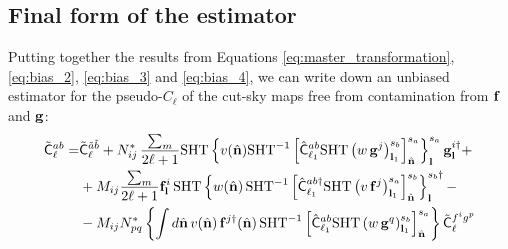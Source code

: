 \documentclass[a4paper,10pt]{article}
\newcommand{\nv}{\hat{\bf n}}
\begin{document}
  \subsection{Final form of the estimator}
    Putting together the results from Equations \ref{eq:master_transformation}, \ref{eq:bias_2}, \ref{eq:bias_3} and \ref{eq:bias_4}, we can write down an unbiased estimator for the pseudo-$C_\ell$ of the cut-sky maps free from contamination from ${\bf f}$ and ${\bf g}$:
    \begin{align}\nonumber
      \tilde{\sf C}^{ab}_\ell=&\tilde{\sf C}^{\tilde{a}\tilde{b}}_\ell+N^*_{ij}\,\frac{\sum_m}{2\ell+1}{\rm SHT}\left\{v(\nv){\rm SHT}^{-1}\left[\hat{\sf C}^{ab}_{\ell_1}{\rm SHT}\left(w\,{\bf g}^j\right)^{s_b}_{{\bf l}_1}\right]^{s_a}_{\nv}\right\}^{s_a}_{\bf l}{\bf g}^{i\dag}_{\bf l}+\\\nonumber
      &+M_{ij}\frac{\sum_{m}}{2\ell+1}{\bf f}^i_{\bf l}\,{\rm SHT}\left\{w(\nv)\,{\rm SHT}^{-1}\left[\hat{\sf C}^{ab\dag}_{\ell_1}{\rm SHT}\left(v\,{\bf f}^j\right)^{s_a}_{{\bf l}_1}\right]^{s_b}_{\nv}\right\}^{s_b\dag}_{\bf l}-\\\label{eq:unbiased_pcl}
      &-M_{ij}N^*_{pq}\left\{\int d\nv\,v(\nv)\,{\bf f}^{j\dag}(\nv)\,{\rm SHT}^{-1}\left[\hat{\sf C}^{ab}_{\ell_1}{\rm SHT}\left(w\,{\bf g}^q\right)^{s_b}_{{\bf l}_1}\right]^{s_a}_{\nv}\right\}\tilde{\sf C}^{f^ig^p}_\ell
    \end{align}
\end{document}
